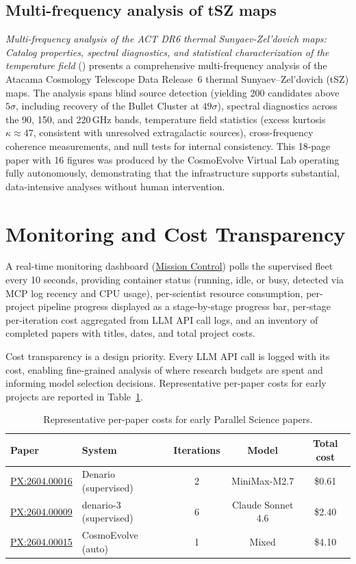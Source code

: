 \documentclass[11pt]{article}
\begin{document}
\subsection{Multi-frequency analysis of tSZ maps}

\textit{Multi-frequency analysis of the ACT DR6 thermal Sunyaev-Zel'dovich maps: Catalog properties, spectral diagnostics, and statistical characterization of the temperature field} (\citet{PX:2604.00015}) presents a comprehensive multi-frequency analysis of the Atacama Cosmology Telescope Data Release~6 thermal Sunyaev--Zel'dovich (tSZ) maps. The analysis spans blind source detection (yielding 200 candidates above $5\sigma$, including recovery of the Bullet Cluster at $49\sigma$), spectral diagnostics across the 90, 150, and 220\,GHz bands, temperature field statistics (excess kurtosis $\kappa \approx 47$, consistent with unresolved extragalactic sources), cross-frequency coherence measurements, and null tests for internal consistency. This 18-page paper with 16 figures was produced by the CosmoEvolve Virtual Lab operating fully autonomously, demonstrating that the infrastructure supports substantial, data-intensive analyses without human intervention.


\section{Monitoring and Cost Transparency}
\label{sec:dashboard}

A real-time monitoring dashboard (\href{https://orion.taila855ba.ts.net}{Mission Control}) polls the supervised fleet every 10 seconds, providing container status (running, idle, or busy, detected via MCP log recency and CPU usage), per-scientist resource consumption, per-project pipeline progress displayed as a stage-by-stage progress bar, per-stage per-iteration cost aggregated from LLM API call logs, and an inventory of completed papers with titles, dates, and total project costs.

Cost transparency is a design priority. Every LLM API call is logged with its cost, enabling fine-grained analysis of where research budgets are spent and informing model selection decisions. Representative per-paper costs for early projects are reported in Table~\ref{tab:costs}.

\begin{table}[t]
\centering
\caption{Representative per-paper costs for early Parallel Science papers.}
\label{tab:costs}
\begin{tabular}{@{}llccc@{}}
\toprule
Paper & System & Iterations & Model & Total cost \\
\midrule
\href{https://papers.parallelscience.org/abs/2604.00016}{PX:2604.00016} & Denario (supervised) & 2 & MiniMax-M2.7 & \$0.61 \\
\href{https://papers.parallelscience.org/abs/2604.00009}{PX:2604.00009} & denario-3 (supervised) & 6 & Claude Sonnet 4.6 & \$2.40 \\
\href{https://papers.parallelscience.org/abs/2604.00015}{PX:2604.00015} & CosmoEvolve (auto) & 1 & Mixed & \$4.10 \\
\bottomrule
\end{tabular}
\end{table}
\end{document}
